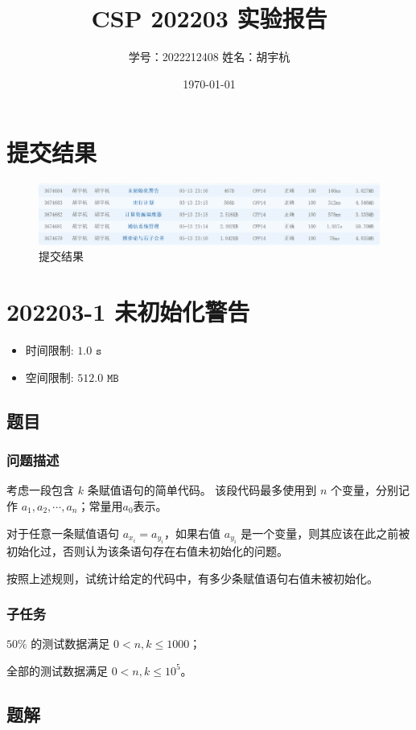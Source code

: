\documentclass[UTF8, 12pt, a4paper, oneside]{ctexart}
\title{CSP 202203 实验报告}
\author{学号：2022212408 姓名：胡宇杭}
\date{\today}
\begin{document}
\maketitle
\section*{提交结果}
\begin{figure}[htbp]
    \centering
    \includegraphics[width = 5in]{提交结果.png}
    \caption{提交结果}
\end{figure}
\section{202203-1 未初始化警告}
\begin{itemize}
    \item 时间限制: $1.0\texttt{ s}$
    \item 空间限制: $512.0\texttt{ MB}$
\end{itemize}
\subsection{题目}
\subsubsection{问题描述}
\par 考虑一段包含 $k$ 条赋值语句的简单代码。 该段代码最多使用到 $n$ 个变量，分别记作 $a_1, a_2, \cdots, a_n$；常量用$a_0$表示。
\par 对于任意一条赋值语句 $a_{x_i} = a_{y_i}$，如果右值 $a_{y_i}$ 是一个变量，则其应该在此之前被初始化过，否则认为该条语句存在右值未初始化的问题。
\par 按照上述规则，试统计给定的代码中，有多少条赋值语句右值未被初始化。
\subsubsection{子任务}
\par $50\%$ 的测试数据满足 $0 < n,k\leq 1000$；
\par 全部的测试数据满足 $0 < n,k\leq 10^5$。
\subsection{题解}
\end{document}
